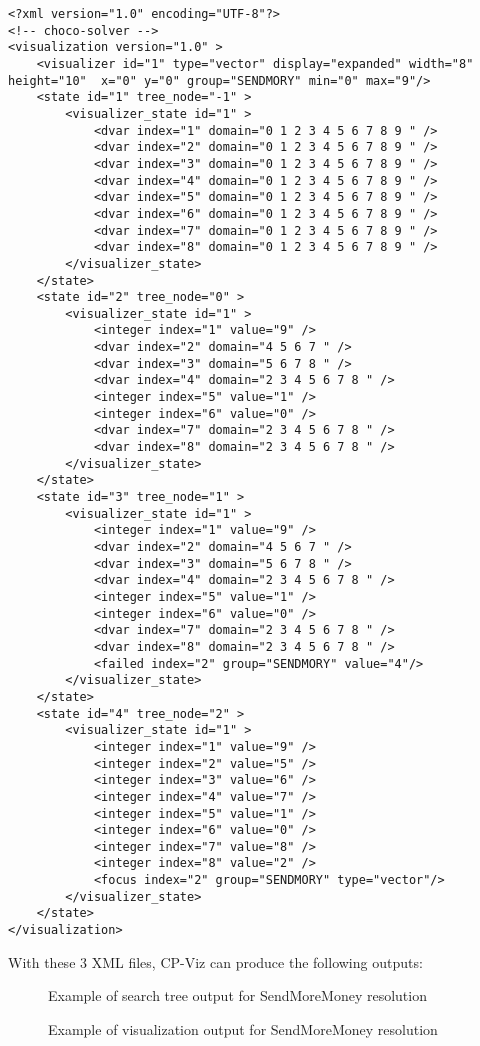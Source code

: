 \begin{lstlisting}[title=visualization-SendMoreMoney.xml,captionpos=b]
<?xml version="1.0" encoding="UTF-8"?>
<!-- choco-solver -->
<visualization version="1.0" >
	<visualizer id="1" type="vector" display="expanded" width="8" height="10"  x="0" y="0" group="SENDMORY" min="0" max="9"/>
	<state id="1" tree_node="-1" >
		<visualizer_state id="1" >
			<dvar index="1" domain="0 1 2 3 4 5 6 7 8 9 " />
			<dvar index="2" domain="0 1 2 3 4 5 6 7 8 9 " />
			<dvar index="3" domain="0 1 2 3 4 5 6 7 8 9 " />
			<dvar index="4" domain="0 1 2 3 4 5 6 7 8 9 " />
			<dvar index="5" domain="0 1 2 3 4 5 6 7 8 9 " />
			<dvar index="6" domain="0 1 2 3 4 5 6 7 8 9 " />
			<dvar index="7" domain="0 1 2 3 4 5 6 7 8 9 " />
			<dvar index="8" domain="0 1 2 3 4 5 6 7 8 9 " />
		</visualizer_state>
	</state>
	<state id="2" tree_node="0" >
		<visualizer_state id="1" >
			<integer index="1" value="9" />
			<dvar index="2" domain="4 5 6 7 " />
			<dvar index="3" domain="5 6 7 8 " />
			<dvar index="4" domain="2 3 4 5 6 7 8 " />
			<integer index="5" value="1" />
			<integer index="6" value="0" />
			<dvar index="7" domain="2 3 4 5 6 7 8 " />
			<dvar index="8" domain="2 3 4 5 6 7 8 " />
		</visualizer_state>
	</state>
	<state id="3" tree_node="1" >
		<visualizer_state id="1" >
			<integer index="1" value="9" />
			<dvar index="2" domain="4 5 6 7 " />
			<dvar index="3" domain="5 6 7 8 " />
			<dvar index="4" domain="2 3 4 5 6 7 8 " />
			<integer index="5" value="1" />
			<integer index="6" value="0" />
			<dvar index="7" domain="2 3 4 5 6 7 8 " />
			<dvar index="8" domain="2 3 4 5 6 7 8 " />
			<failed index="2" group="SENDMORY" value="4"/>
		</visualizer_state>
	</state>
	<state id="4" tree_node="2" >
		<visualizer_state id="1" >
			<integer index="1" value="9" />
			<integer index="2" value="5" />
			<integer index="3" value="6" />
			<integer index="4" value="7" />
			<integer index="5" value="1" />
			<integer index="6" value="0" />
			<integer index="7" value="8" />
			<integer index="8" value="2" />
			<focus index="2" group="SENDMORY" type="vector"/>
		</visualizer_state>
	</state>
</visualization>
\end{lstlisting}

With these 3 XML files, CP-Viz can produce the following outputs:

\begin{figure}[!htp]
	\centerline{}
	\caption[]{Example of search tree output for SendMoreMoney resolution}\label{fig:media/tree-SendMoreMoney2.pdf}
\end{figure}

\begin{figure}[!htp]
	\centerline{}
	\caption[]{Example of visualization output for SendMoreMoney resolution}\label{fig:media/visualization-SendMoreMoney4.pdf}
\end{figure}
